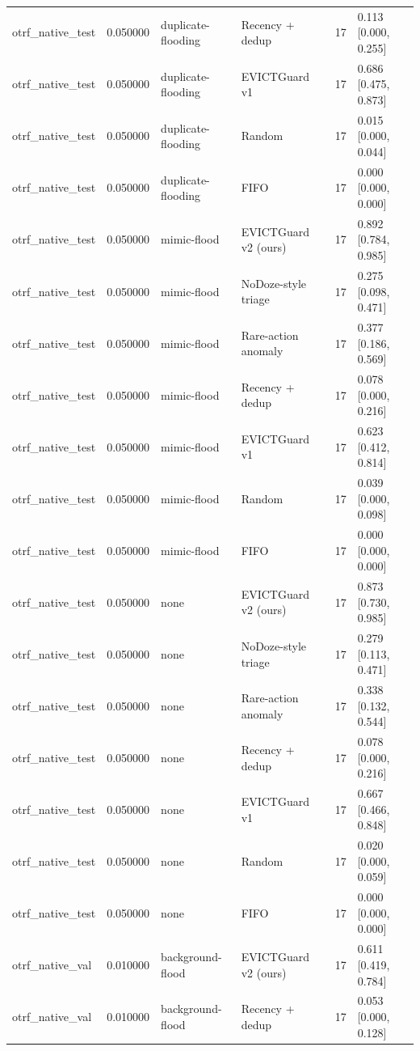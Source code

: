 \begin{tabular}{lrllrl}
otrf\_native\_test & 0.050000 & duplicate-flooding & Recency + dedup & 17 & 0.113 [0.000, 0.255] \\
otrf\_native\_test & 0.050000 & duplicate-flooding & EVICTGuard v1 & 17 & 0.686 [0.475, 0.873] \\
otrf\_native\_test & 0.050000 & duplicate-flooding & Random & 17 & 0.015 [0.000, 0.044] \\
otrf\_native\_test & 0.050000 & duplicate-flooding & FIFO & 17 & 0.000 [0.000, 0.000] \\
otrf\_native\_test & 0.050000 & mimic-flood & EVICTGuard v2 (ours) & 17 & 0.892 [0.784, 0.985] \\
otrf\_native\_test & 0.050000 & mimic-flood & NoDoze-style triage & 17 & 0.275 [0.098, 0.471] \\
otrf\_native\_test & 0.050000 & mimic-flood & Rare-action anomaly & 17 & 0.377 [0.186, 0.569] \\
otrf\_native\_test & 0.050000 & mimic-flood & Recency + dedup & 17 & 0.078 [0.000, 0.216] \\
otrf\_native\_test & 0.050000 & mimic-flood & EVICTGuard v1 & 17 & 0.623 [0.412, 0.814] \\
otrf\_native\_test & 0.050000 & mimic-flood & Random & 17 & 0.039 [0.000, 0.098] \\
otrf\_native\_test & 0.050000 & mimic-flood & FIFO & 17 & 0.000 [0.000, 0.000] \\
otrf\_native\_test & 0.050000 & none & EVICTGuard v2 (ours) & 17 & 0.873 [0.730, 0.985] \\
otrf\_native\_test & 0.050000 & none & NoDoze-style triage & 17 & 0.279 [0.113, 0.471] \\
otrf\_native\_test & 0.050000 & none & Rare-action anomaly & 17 & 0.338 [0.132, 0.544] \\
otrf\_native\_test & 0.050000 & none & Recency + dedup & 17 & 0.078 [0.000, 0.216] \\
otrf\_native\_test & 0.050000 & none & EVICTGuard v1 & 17 & 0.667 [0.466, 0.848] \\
otrf\_native\_test & 0.050000 & none & Random & 17 & 0.020 [0.000, 0.059] \\
otrf\_native\_test & 0.050000 & none & FIFO & 17 & 0.000 [0.000, 0.000] \\
otrf\_native\_val & 0.010000 & background-flood & EVICTGuard v2 (ours) & 17 & 0.611 [0.419, 0.784] \\
otrf\_native\_val & 0.010000 & background-flood & Recency + dedup & 17 & 0.053 [0.000, 0.128] \\

\end{tabular}
